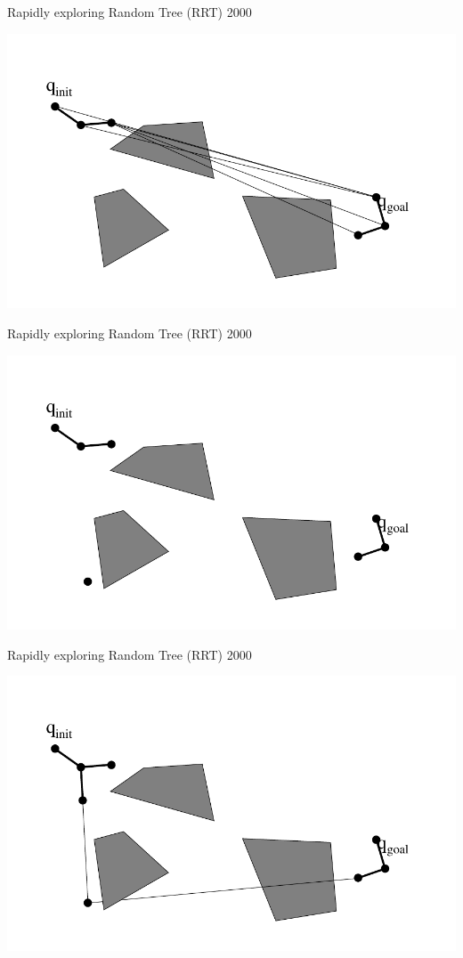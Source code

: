 \begin{frame} {Rapidly exploring Random Tree (RRT) 2000}
\centerline {
  \includegraphics[width=.8\linewidth]{figures/RRT9.pdf}
}
\end{frame}

\begin{frame} {Rapidly exploring Random Tree (RRT) 2000}
\centerline {
  \includegraphics[width=.8\linewidth]{figures/RRT10.pdf}
}
\end{frame}

\begin{frame} {Rapidly exploring Random Tree (RRT) 2000}
\centerline {
  \includegraphics[width=.8\linewidth]{figures/RRT11.pdf}
}
\end{frame}

